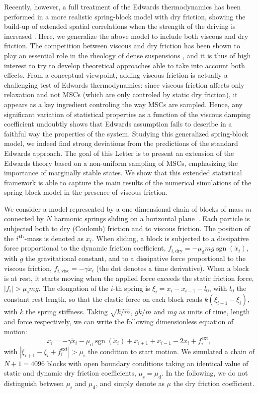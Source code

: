 \documentclass[prl,twocolumn,floats,floatfix,aps,superscriptaddress,showpacs]{revtex4-1}
\newcommand{\be}{\begin{equation}}
\newcommand{\ee}{\end{equation}}
\newcommand{\md}{\mu_{\textrm{d}}}
\newcommand{\ms}{\mu_{\textrm{s}}}
\newcommand{\fei}{f^{\textrm{ext}}_i}
\DeclareMathOperator{\sgn}{sgn}
\begin{document}
Recently, however, a full treatment of the Edwards thermodynamics has
been performed in a more realistic spring-block model with dry
friction, showing the build-up of extended spatial correlations when
the strength of the driving is increased \cite{Gradenigo15}.
Here, we generalize the above model to include both viscous
and dry friction. The competition between viscous and dry friction has
been shown to play an essential role in the rheology of dense
suspensions \cite{Hebraud03,Mari13,Mari15},
and it is thus of high interest to try
to develop theoretical approaches able to take into account both
effects.  From a conceptual viewpoint, adding viscous friction is
actually a challenging test of Edwards thermodynamics: since viscous
friction affects only relaxation and not MSCs
(which are only controled by static dry friction), it appears as a key
ingredient controling the way MSCs are sampled.
Hence, any significant variation of
statistical properties as a function of the viscous damping
coefficient undoubtly shows that Edwards assumption fails to describe
in a faithful way the properties of the system.  Studying this
generalized spring-block model, we indeed find strong deviations from
the predictions of the standard Edwards approach.
The goal of this Letter is to present an extension of the Edwards theory
based on a non-uniform sampling of MSCs, emphasizing the
  importance of marginally stable states.
We show that this extended statistical framework is able to capture the main results of the numerical simulations of the spring-block model in the presence of viscous friction.



We consider a model represented by a one-dimensional chain of blocks of mass
$m$ connected by $N$ harmonic springs sliding on a horizontal
plane~\cite{BK67,CL89,GB10,BPG11,BGP14,Gradenigo15}.  Each particle is subjected
both to dry (Coulomb) friction and to viscous friction.  The position
of the $i^{\rm th}$-mass is denoted as $x_i$.  When sliding, a block
is subjected to a dissipative force proportional to the dynamic
friction coefficient, $f_{i,\textrm{dry}} = -\md mg \sgn(\dot{x}_i)$,
with $g$ the gravitational constant, and to a dissipative force
proportional to the viscous friction, $f_{i,\textrm{visc}} = -\gamma
\dot{x}_i$ (the dot denotes a time derivative).
When a block is at rest, it starts moving when the applied force
exceeds the static friction force, $|f_i|> \ms mg$.  The
elongation of the $i$-th spring is $\xi_i = x_i-x_{i-1}-l_0$, with
$l_0$ the constant rest length, so that the elastic force on each
block reads $ k (\xi_{i+1}-\xi_i)$, with $k$ the spring stiffness.
Taking $\sqrt{k/m}$, $gk/m$ and $mg$ as units of time, length and force
respectively, we can write the following dimensionless equation of motion: 
\be \label{eqofmotion}
\ddot{x}_i = - \gamma
\dot{x}_i -\md \sgn(\dot{x}_i) + x_{i+1}+x_{i-1}-2x_i + \fei ,
\ee
with $|\xi_{i+1}-\xi_i +\fei| > \ms$ the condition to start motion.
We simulated a chain of $N+1=4096$ blocks with open boundary
conditions taking an identical value of static and dynamic dry
friction coefficients, $\ms = \md$.
In the following, we do not distinguish between $\ms$ and $\md$,
and simply denote as $\mu$ the dry friction coefficient.
\end{document}

